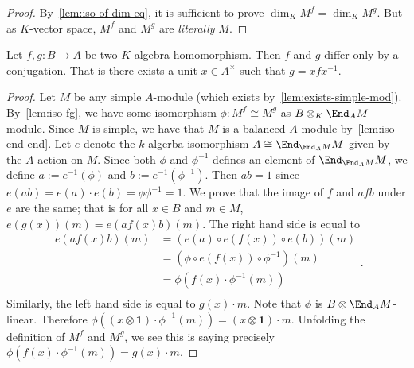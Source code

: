 \begin{proof}
  By~\cref{lem:iso-of-dim-eq}, it is sufficient to prove
  $\dim_{K}M^{f}=\dim_{K}M^{g}$. But as $K$-vector space, $M^{f}$ and $M^{g}$
  are {\em literally\/} $M$.
\end{proof}

\begin{theorem}\label{thm:skolem-noether}
  Let $f, g : B \to A$ be two $K$-algebra homomorphism. Then $f$ and $g$ differ
  only by a conjugation. That is there exists a unit $x \in A^{\times}$ such
  that $g = x f x^{-1}$.
  \leanok
\end{theorem}

\begin{proof}
  Let $M$ be any simple $A$-module (which exists
  by~\cref{lem:exists-simple-mod}). By~\cref{lem:iso-fg}, we have some
  isomorphism $\phi : M^{f}\cong M^{g}$ as $B\otimes_{K}\End_{A}M$-module. Since
  $M$ is simple, we have that $M$ is a balanced $A$-module
  by~\cref{lem:iso-end-end}. Let $e$ denote the $k$-algerba isomorphism
  $A \cong \End_{\End_{A}M}M$ given by the $A$-action on $M$. Since both $\phi$
  and $\phi^{-1}$ defines an element of $\End_{\End_{A}M}M$, we define
  $a := e^{-1}(\phi)$ and $b := e^{-1}(\phi^{-1})$. Then $ab = 1$ since
  $e(ab)=e(a)\cdot e(b)=\phi\phi^{-1}=1$. We prove that the image of $f$ and
  $afb$ under $e$ are the same; that is for all $x\in B$ and $m\in M$,
  $e(g(x))(m) = e(a f(x) b)(m)$. The right hand side is equal to
  \[
    \begin{aligned}
      e(af(x)b)(m) &=\left(e(a)\circ e(f(x))\circ e(b)\right)(m) \\
                   &=\left(\phi\circ e(f(x))\circ \phi^{-1}\right)(m)\\
                   &=\phi\left(f(x)\cdot\phi^{-1}(m)\right) \\
    \end{aligned}.
  \]
  Similarly, the left hand side is equal to $g(x)\cdot m$. Note that $\phi$ is
  $B\otimes \End_{A}M$-linear. Therefore
  $\phi\left(\left(x\otimes\mathbf{1}\right)\cdot \phi^{-1}(m)\right) = \left(x\otimes\mathbf{1}\right)\cdot m$.
  Unfolding the definition of $M^{f}$ and $M^{g}$, we see this is saying
  precisely $\phi\left(f(x)\cdot\phi^{-1}(m)\right)=g(x)\cdot m$.
\end{proof}






